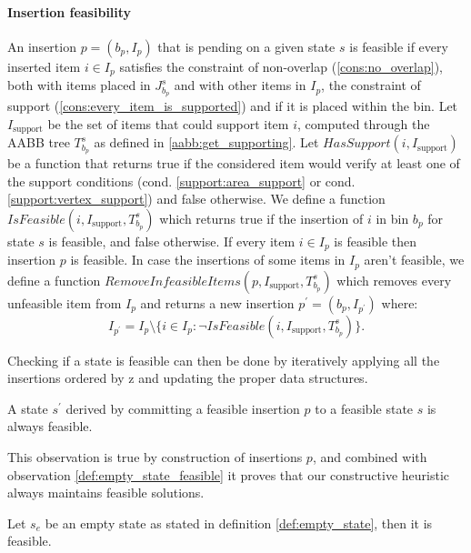 \paragraph*{Insertion feasibility}
An insertion $p = (b_p, I_p)$ that is pending on a given state $s$ is feasible if every inserted item $i \in I_p$ satisfies the constraint of non-overlap (\ref{cons:no_overlap}), both with items placed in $J^s_{b_p}$ and with other items in $I_p$, the constraint of support (\ref{cons:every_item_is_supported}) and if it is placed within the bin.
Let $I_{\text{support}}$ be the set of items that could support item $i$, computed through the AABB tree $T^s_{b_p}$ as defined in \cref{aabb:get_supporting}.
Let $HasSupport(i, I_{\text{support}})$ be a function that returns true if the considered item would verify at least one of the support conditions (cond. \ref{support:area_support} or cond. \ref{support:vertex_support}) and false otherwise.
We define a function $IsFeasible(i, I_{\text{support}}, T^s_{b_p})$ which returns true if the insertion of $i$ in bin $b_p$ for state $s$ is feasible, and false otherwise.
If every item $i \in I_p$ is feasible then insertion $p$ is feasible.
In case the insertions of some items in $I_p$ aren't feasible, we define a function $RemoveInfeasibleItems(p, I_{\text{support}}, T^s_{b_p})$ which removes every unfeasible item from $I_p$ and returns a new insertion $p^\prime = (b_p, I_{p^\prime})$ where:
\begin{equation*}
    I_{p^\prime} = I_p \setminus \{i \in I_p : \lnot IsFeasible(i, I_{\text{support}}, T^s_{b_p})\}. \label{algo:remove_infeasible}
\end{equation*}

Checking if a state is feasible can then be done by iteratively applying all the insertions ordered by z and updating the proper data structures.
\begin{observation}
    \label{prop:feasible_expansion}
    A state $s^\prime$ derived by committing a feasible insertion $p$ to a feasible state $s$ is always feasible.
\end{observation}
This observation is true by construction of insertions $p$, and combined with observation \ref{def:empty_state_feasible} it proves that our constructive heuristic always maintains feasible solutions. 
\begin{observation}
    \label{def:empty_state_feasible}
    Let $s_e$ be an empty state as stated in definition \ref{def:empty_state}, then it is feasible.
\end{observation}

